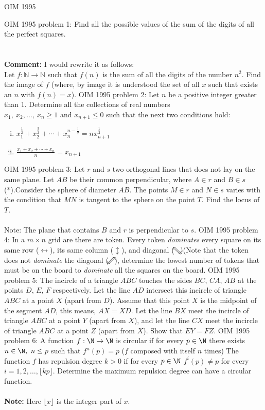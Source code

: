 OIM 1995 

OIM 1995 problem 1:  Find all the possible values of the sum of the digits of all the perfect squares. \\\\
[Commented by djimenez] \\
\textbf{Comment: }I would rewrite it as follows: \\
Let $f: \mathbb{N}\rightarrow \mathbb{N}$ such that $f(n)$ is the sum of all the digits  of the number $n^2$. Find the image of $f$ (where, by image it is understood the set of all $x$ such that exists an $n$ with $f(n)=x$). 
OIM 1995 problem 2:  Let $n$ be a positive integer greater than 1. Determine all the collections of real numbers  $x_1,\ x_2,\dots,\ x_n\geq1\mbox{ and }x_{n+1}\leq0$ such that the next two conditions hold:
\begin{enumerate}[(i)]
  \item $x_1^{\frac12}+x_2^{\frac32}+\cdots+x_n^{n-\frac12}= nx_{n+1}^\frac12$
  \item $\frac{x_1+x_2+\cdots+x_n}{n}=x_{n+1}$
\end{enumerate} 
OIM 1995 problem 3:  Let $ r$ and $ s$ two orthogonal lines that does not lay on the same plane. Let $ AB$ be their common perpendicular, where $ A\in{}r$ and $ B\in{}s$(*).Consider the sphere of diameter $ AB$. The points $ M\in{r}$ and $ N\in{s}$ varies with the condition that $ MN$ is tangent to the sphere on the point $ T$. Find the locus of $ T$. \\\\
Note: The plane that contains $ B$ and $ r$ is perpendicular to $ s$. 
OIM 1995 problem 4:  In a $m\times{n}$ grid are there are token. Every  token \textit{dominates } every square on its same row ($\leftrightarrow$), its same column ($\updownarrow$), and diagonal ($\searrow\hspace{-4.45mm}\nwarrow$)(Note that the token does not \emph{dominate} the diagonal ($\nearrow\hspace{-4.45mm}\swarrow$), determine the lowest number of tokens that must be on the board to \textit{dominate } all the squares on the board. 
OIM 1995 problem 5:  The incircle of a triangle $ABC$ touches the sides $BC$, $CA$, $AB$ at the points $D$, $E$, $F$ respectively. Let the line $AD$ intersect this incircle of triangle $ABC$ at a point $X$ (apart from $D$). Assume that this point $X$ is the midpoint of the segment $AD$, this means, $AX = XD$. Let the line $BX$ meet the incircle of triangle $ABC$ at a point $Y$ (apart from $X$), and let the line $CX$ meet the incircle of triangle $ABC$ at a point $Z$ (apart from $X$). Show that $EY = FZ$. 
OIM 1995 problem 6:  A function $f: \N\rightarrow\N$ is circular if for every $p\in\N$ there exists $n\in\N,\ n\leq{p}$ such that $f^n(p)=p$ ($f$ composed with itself $n$ times) The function $f$ has repulsion degree $k>0$ if for every $p\in\N$ $f^i(p)\neq{p}$ for every $i=1,2,\dots,\lfloor{kp}\rfloor$. Determine the maximum repulsion degree can have a circular function. \\\\
\textbf{Note:} Here $\lfloor{x}\rfloor$ is the integer part of $x$. 

